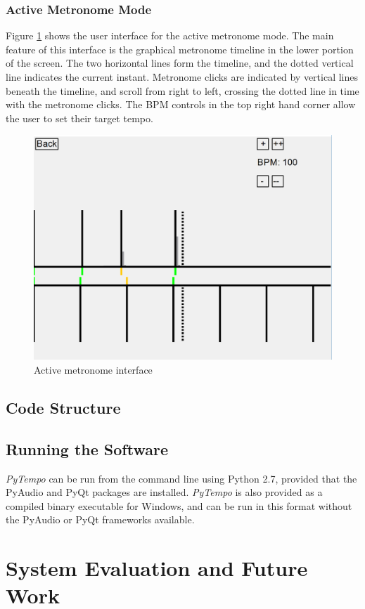 \documentclass[hidelinks,12pt]{article}
\begin{document}
\subsubsection{Active Metronome Mode}
Figure \ref{fig:ActiveMetronomeScreenshot} shows the user interface for the active metronome mode. The main feature of this interface is the graphical metronome timeline in the lower portion of the screen. The two horizontal lines form the timeline, and the dotted vertical line indicates the current instant. Metronome clicks are indicated by vertical lines beneath the timeline, and scroll from right to left, crossing the dotted line in time with the metronome clicks. The BPM controls in the top right hand corner allow the user to set their target tempo.

\begin{figure}[H]
	\begin{center}
		\includegraphics[scale=0.5]{ActiveMetronomeScreenshot.png}
		\caption{Active metronome interface}
		\label{fig:ActiveMetronomeScreenshot}
	\end{center}
\end{figure}
\subsection{Code Structure}
\subsection{Running the Software}
\textit{PyTempo} can be run from the command line using Python 2.7, provided that the PyAudio and PyQt packages are installed. \textit{PyTempo} is also provided as a compiled binary executable for Windows, and can be run in this format without the PyAudio or PyQt frameworks available.
\section{System Evaluation and Future Work}
\end{document}
